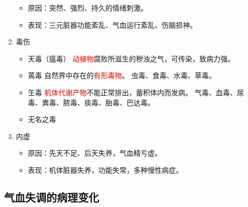 \documentclass[cn,hazy,blue,12pt,normal,founder]{elegantnote}
\newcommand{\redt}[1]{\textcolor{red}{{}#1}}      %
\begin{document}
\begin{enumerate}
  \begin{itemize}
    \item 原因：突然、强烈、持久的情绪刺激。
    \item 表现：三元脏器功能紊乱、气血运行紊乱、伤脑损神。
  \end{itemize}

  \item 毒伤

  \begin{itemize}
    \item 天毒（瘟毒）
    \subitem \redt{动植物}腐败所滋生的秽浊之气，可传染，致病力强。
    \item 蔫毒
    \subitem 自然界中存在的\redt{有形毒物}。
    \subitem 虫毒、食毒、水毒、草毒。
    \item 玍毒
    \subitem \redt{机体代谢产物}不能正常排出，蓄积体内而发病。
    \subitem 气毒、血毒、尿毒、粪毒、脓毒、痰毒、胎毒、巴达毒。
    \item 无名之毒
  \end{itemize}

  \item 内虚

  \begin{itemize}
    \item 原因：先天不足、后天失养，气血精亏虚。
    \item 表现：机体脏器失养，功能失常，多种慢性病症。
  \end{itemize}
\end{enumerate}

\subsection{气血失调的病理变化}
\end{document}
